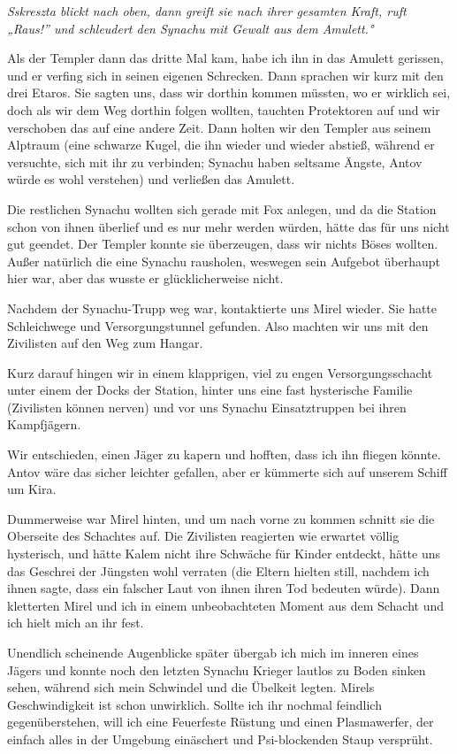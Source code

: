 \documentclass[11pt]{article}
\begin{document}
\emph{Sskreszta blickt nach oben, dann greift sie nach ihrer gesamten
Kraft, ruft „Raus!'' und schleudert den Synachu mit Gewalt aus dem
Amulett.°}

Als der Templer dann das dritte Mal kam, habe ich ihn in das Amulett
gerissen, und er verfing sich in seinen eigenen Schrecken. Dann sprachen
wir kurz mit den drei Etaros. Sie sagten uns, dass wir dorthin kommen
müssten, wo er wirklich sei, doch als wir dem Weg dorthin folgen
wollten, tauchten Protektoren auf und wir verschoben das auf eine andere
Zeit. Dann holten wir den Templer aus seinem Alptraum (eine schwarze
Kugel, die ihn wieder und wieder abstieß, während er versuchte, sich mit
ihr zu verbinden; Synachu haben seltsame Ängste, Antov würde es wohl
verstehen) und verließen das Amulett.

Die restlichen Synachu wollten sich gerade mit Fox anlegen, und da die
Station schon von ihnen überlief und es nur mehr werden würden, hätte
das für uns nicht gut geendet. Der Templer konnte sie überzeugen, dass
wir nichts Böses wollten. Außer natürlich die eine Synachu rausholen,
weswegen sein Aufgebot überhaupt hier war, aber das wusste er
glücklicherweise nicht.

Nachdem der Synachu-Trupp weg war, kontaktierte uns Mirel wieder. Sie
hatte Schleichwege und Versorgungstunnel gefunden. Also machten wir uns
mit den Zivilisten auf den Weg zum Hangar.

Kurz darauf hingen wir in einem klapprigen, viel zu engen
Versorgungsschacht unter einem der Docks der Station, hinter uns eine
fast hysterische Familie (Zivilisten können nerven) und vor uns Synachu
Einsatztruppen bei ihren Kampfjägern.

Wir entschieden, einen Jäger zu kapern und hofften, dass ich ihn fliegen
könnte. Antov wäre das sicher leichter gefallen, aber er kümmerte sich
auf unserem Schiff um Kira.

Dummerweise war Mirel hinten, und um nach vorne zu kommen schnitt sie
die Oberseite des Schachtes auf. Die Zivilisten reagierten wie erwartet
völlig hysterisch, und hätte Kalem nicht ihre Schwäche für Kinder
entdeckt, hätte uns das Geschrei der Jüngsten wohl verraten (die Eltern
hielten still, nachdem ich ihnen sagte, dass ein falscher Laut von ihnen
ihren Tod bedeuten würde). Dann kletterten Mirel und ich in einem
unbeobachteten Moment aus dem Schacht und ich hielt mich an ihr fest.

Unendlich scheinende Augenblicke später übergab ich mich im inneren
eines Jägers und konnte noch den letzten Synachu Krieger lautlos zu
Boden sinken sehen, während sich mein Schwindel und die Übelkeit legten.
Mirels Geschwindigkeit ist schon unwirklich. Sollte ich ihr nochmal
feindlich gegenüberstehen, will ich eine Feuerfeste Rüstung und einen
Plasmawerfer, der einfach alles in der Umgebung einäschert und
Psi-blockenden Staup versprüht.
\end{document}
